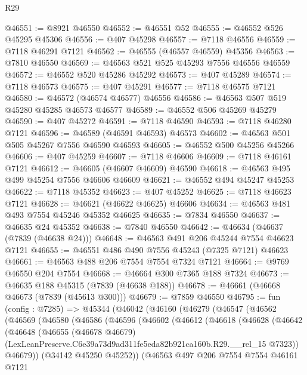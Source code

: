 \begin{lexlean}{R29}
\begin{coremodule}
@46551 := @8921 @46550
@46552 := @46551 @52
@46555 := @46552 @526 @45295 @45306
@46556 := @407 @45298
@46557 := @7118 @46556
@46559 := @7118 @46291 @7121
@46562 := @46555 (@46557 @46559) @45356
@46563 := @7810 @46550
@46569 := @46563 @521 @525 @45293 @7556 @46556 @46559
@46572 := @46552 @520 @45286 @45292
@46573 := @407 @45289
@46574 := @7118 @46573
@46575 := @407 @45291
@46577 := @7118 @46575 @7121
@46580 := @46572 (@46574 @46577) @46556
@46586 := @46563 @507 @519 @45280 @45285 @46573 @46577
@46589 := @46552 @506 @45269 @45279
@46590 := @407 @45272
@46591 := @7118 @46590
@46593 := @7118 @46280 @7121
@46596 := @46589 (@46591 @46593) @46573
@46602 := @46563 @501 @505 @45267 @7556 @46590 @46593
@46605 := @46552 @500 @45256 @45266
@46606 := @407 @45259
@46607 := @7118 @46606
@46609 := @7118 @46161 @7121
@46612 := @46605 (@46607 @46609) @46590
@46618 := @46563 @495 @499 @45254 @7556 @46606 @46609
@46621 := @46552 @494 @45247 @45253
@46622 := @7118 @45352
@46623 := @407 @45252
@46625 := @7118 @46623 @7121
@46628 := @46621 (@46622 @46625) @46606
@46634 := @46563 @481 @493 @7554 @45246 @45352 @46625
@46635 := @7834 @46550
@46637 := @46635 @24 @45352
@46638 := @7840 @46550
@46642 := @46634 (@46637 (@7839 (@46638 @24)))
@46648 := @46563 @491 @206 @45244 @7554 @46623 @7121
@46655 := @46551 @486 @490 @7556 @45243 (@7325 @7121) @46623
@46661 := @46563 @488 @206 @7554 @7554 @7324 @7121
@46664 := @9769 @46550 @204 @7554
@46668 := @46664 @300 @7365 @188 @7324
@46673 := @46635 @188 @45315 (@7839 (@46638 @188))
@46678 := @46661 (@46668 @46673 (@7839 (@45613 @300)))
@46679 := @7859 @46550
@46795 := fun (config : @7285) =>
  @45344
    (@46042
      (@46160
        (@46279
          (@46547
            (@46562
              (@46569
                (@46580
                  (@46586
                    (@46596
                      (@46602
                        (@46612
                          (@46618
                            (@46628
                              (@46642
                                (@46648
                                  (@46655
                                    (@46678 @46679)
                                    (LexLeanPreserve.C6e39a73d9ad311fe5eda82b921ca160b.R29.__rel_15
                                      @7323))
                                  @46679))
                              (@34142 @45250 @45252))
                            (@46563
                              @497
                              @206
                              @7554
                              @7554
                              @46161
                              @7121

\end{coremodule}
\end{lexlean}
